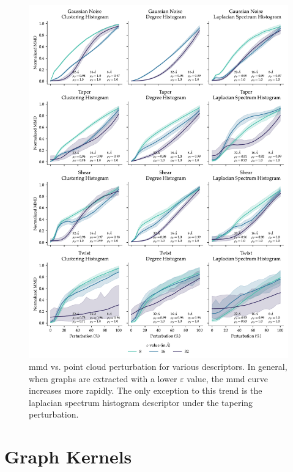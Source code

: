 \begin{figure}
  \includegraphics[width=\textwidth]{./figures/results/res_2_1.pdf}
  \caption[Influence of $\varepsilon$ on the sensitivity of \acrshort{mmd} to perturbations.]{\acrshort{mmd} vs. point cloud perturbation for various descriptors. In general,
when graphs are extracted with a lower $\varepsilon$ value, the \acrshort{mmd} curve
increases more rapidly. The only exception to this trend is the laplacian
spectrum histogram descriptor under the tapering perturbation.}
  \label{fig:mmd_sensitivity_eps}
\end{figure}

\section{Graph Kernels}\label{sec:results_graph_kernels}

